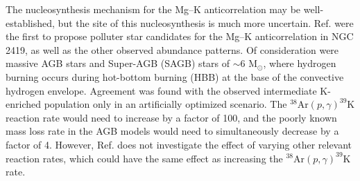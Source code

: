 
The nucleosynthesis mechanism for the Mg--K anticorrelation may be well-established, but the site of this nucleosynthesis is much more uncertain. Ref. \cite{Ventura2012} were the first to propose polluter star candidates for the Mg--K anticorrelation in NGC 2419, as well as the other observed abundance patterns. Of consideration were massive AGB stars and Super-AGB (SAGB) stars of $\sim 6$ $\mathrm{M}_{\odot}$, where hydrogen burning occurs during hot-bottom burning (HBB) at the base of the convective hydrogen envelope. Agreement was found with the observed intermediate K-enriched population only in an artificially optimized scenario. The $^{38}\mathrm{Ar}(p,\gamma)^{39}\mathrm{K}$ reaction rate would need to increase by a factor of 100, and the poorly known mass loss rate in the AGB models would need to simultaneously decrease by a factor of 4. However, Ref. \cite{Ventura2012} does not investigate the effect of varying other relevant reaction rates, which could have the same effect as increasing the $^{38}\mathrm{Ar}(p,\gamma)^{39}\mathrm{K}$ rate.


